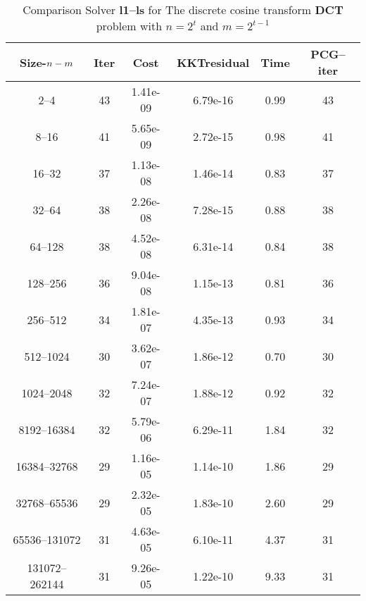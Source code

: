 \documentclass[letterpaper,12pt,oneside,final]{book}
\begin{document}
\begin{table}
\caption{Comparison Solver  {\bf l1--ls}  for  The discrete cosine transform {\bf DCT} problem with  $n=2^{t}$ and $m=2^{t-1}$} 
\begin{center}
\begin{tabular}{|*{6}{c}|} \hline
Size-$n\--m$ & \multicolumn{1}{c}{Iter} & \multicolumn{1}{c}{Cost}& \multicolumn{1}{c}{KKTresidual} & \multicolumn{1}{c}{Time} & \multicolumn{1}{c|}{PCG--iter} \\ 
\hline
2--4    &43    &1.41e-09    &6.79e-16    &0.99    &43 \\
8--16    &41    &5.65e-09    &2.72e-15    &0.98    &41 \\
16--32    &37    &1.13e-08    &1.46e-14    &0.83    &37 \\
32--64    &38    &2.26e-08    &7.28e-15    &0.88    &38 \\
64--128    &38    &4.52e-08    &6.31e-14    &0.84    &38 \\
128--256    &36    &9.04e-08    &1.15e-13    &0.81    &36 \\
256--512    &34    &1.81e-07    &4.35e-13    &0.93    &34 \\
512--1024    &30    &3.62e-07    &1.86e-12    &0.70    &30 \\
1024--2048    &32    &7.24e-07    &1.88e-12    &0.92    &32 \\
8192--16384    &32    &5.79e-06    &6.29e-11    &1.84    &32 \\
16384--32768    &29    &1.16e-05    &1.14e-10    &1.86    &29 \\
32768--65536    &29    &2.32e-05    &1.83e-10    &2.60    &29 \\
65536--131072    &31    &4.63e-05    &6.10e-11    &4.37    &31 \\
131072--262144    &31    &9.26e-05    &1.22e-10    &9.33    &31 \\
\hline
\end{tabular}
\end{center}
\end{table}
\end{document}
